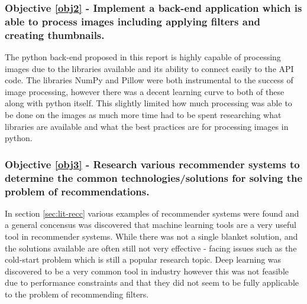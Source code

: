 \documentclass[a4paper,12pt]{report}
\begin{document}
  \subsubsection{Objective \ref{obj2} - Implement a back-end application which is able to process images including applying filters and creating thumbnails.}
    The python back-end proposed in this report is highly capable of processing images due to the libraries available and its ability to connect easily to the API code. The libraries NumPy and Pillow were both instrumental to the success of image processing, however there was a decent learning curve to both of these along with python itself. This slightly limited how much processing was able to be done on the images as much more time had to be spent researching what libraries are available and what the best practices are for processing images in python.

  \subsubsection{Objective \ref{obj3} - Research various recommender systems to determine the common technologies/solutions for solving the problem of recommendations.}
    In section \ref{sec:lit-recc} various examples of recommender systems were found and a general concensus was discovered that machine learning tools are a very useful tool in recommender systems. While there was not a single blanket solution, and the solutions available are often still not very effective - facing issues such as the cold-start problem which is still a popular research topic. Deep learning was discovered to be a very common tool in industry however this was not feasible due to performance constraints and that they did not seem to be fully applicable to the problem of recommending filters.
\end{document}
